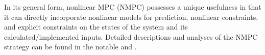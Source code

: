 In its general form, nonlinear MPC (NMPC) possesses a unique usefulness
in that it can directly incorporate nonlinear models for prediction,
nonlinear constraints, and explicit constraints on the states of the system
and its calculated/implemented inputs. Detailed descriptions and analyses of the
NMPC strategy can be found in the notable \cite{262032} and \cite{FINDEISEN2003190}.
